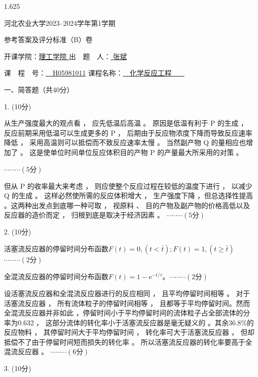 \documentclass[12pt, b5paper]{article}
\begin{document}
\begin{spacing}{1.625}

\centerline{{\Large 河北农业大学2023--2024学年第1学期}}

\centerline{\Large 参考答案及评分标准（B）卷}

\centerline{开课学院：\underline{\quad 理工学院 \quad} \quad 出\ \ 题\ \ 人：\underline{ \qquad \qquad 张斌 \qquad \qquad}}

\centerline{课\ \ 程\ \ 号：\underline{\ \ H05981011\quad} \quad 课程名称：\underline{\quad \quad \ \ 化学反应工程 \quad \ \ \ }}

\bigskip

一、简答题（共40分）

1. (10分) 

从生产强度最大的观点看 ， 应先低温后高温 。 原因是低温有利于 P 的生成 ， 反应前期采用低温可以生成更多的 P ， 后期由于反应物浓度下降而导致反应速率降低 ， 采用高温则可以抵偿而不致反应速率太慢 。 当然副产物 Q 的量相应也增加了 。 这是使单位时间单位反应体积目的产物 P 的产量最大所采用的对策 。

\hfill $\cdots \cdots \cdots (5\text{分})$

但从 P 的收率最大来考虑 ， 则应使整个反应过程在较低的温度下进行 ， 以减少 Q 的生成 。 这样必然使所需的反应体积增大 ， 生产强度下降 ，但总选择性提高 。这两种出发点到底哪一种可取 ， 视原料 、 目的产物及副产物的价格高低以及反应器的造价而定 ， 归根到底是取决于经济因素 。 \hfill $\cdots \cdots \cdots (5\text{分})$

\bigskip
\bigskip

2. (10分) 

活塞流反应器的停留时间分布函数$F(t) = 0, (t<\bar{t}); F(t) = 1, (t\geqslant   \bar{t})$ \hfill $\cdots \cdots \cdots (2\text{分})$

全混流反应器的停留时间分布函数$F(t) = 1 - \mathrm{e}^{-t/\tau}$。\hfill $\cdots \cdots \cdots (2\text{分})$

设活塞流反应器和全混流反应器进行的反应相同 ， 且平均停留时间相等 。 对于活塞流反应器 ， 所有流体粒子的停留时间相等 ， 且都等于平均停留时间。然而全混流反应器并非如此 ，停留时间小于平均停留时间的流体粒子占全部流体的分率为0.632 ， 这部分流体的转化率小于活塞流反应器是毫无疑义的 。其余36.8\%的反应物料 ， 其停留时间大于平均停留时间 ， 转化率可大于活塞流反应器 ， 但却抵偿不了由于停留时间短而损失的转化率 。 所以活塞流反应器的转化率要高于全混流反应器 。 \hfill $\cdots \cdots \cdots (6\text{分})$

\bigskip
\bigskip

3. (10分) 


\end{spacing}
\end{document}
